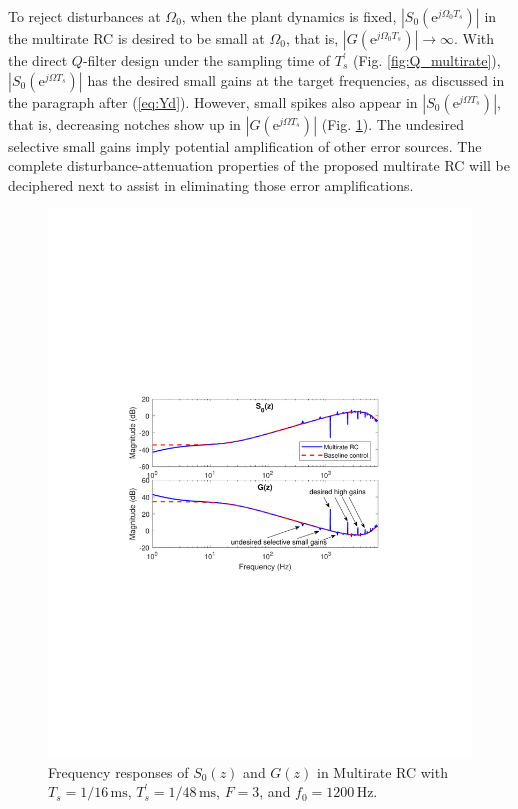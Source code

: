 \documentclass [11pt, proquest] {uwthesis}[2020/02/24]
\begin{document}
To reject disturbances at $\Omega_{0}$, when the plant dynamics
is fixed, $|S_{0}(\text{e}^{j\Omega_{0}T_{s}})|$ in the multirate
RC is desired to be small at $\Omega_{0}$, that is, $|G(\text{e}^{j\Omega_{0}T_{s}})|\rightarrow\infty$.
With the direct $Q$-filter design under the sampling time of $T_{s}^{'}$
(Fig. \ref{fig:Q_multirate}), $|S_{0}(\text{e}^{j\Omega T_{s}})|$
has the desired small gains at the target frequencies, as discussed
in the paragraph after (\ref{eq:Yd}). However, small spikes also
appear in $|S_{0}(\text{e}^{j\Omega T_{s}})|$, that is, decreasing
notches show up in $|G(\text{e}^{j\Omega T_{s}})|$ (Fig. \ref{fig:Sensitivity_func}).
The undesired selective small gains imply potential amplification
of other error sources. The complete disturbance-attenuation properties
of the proposed multirate RC will be deciphered next to assist in
eliminating those error amplifications.
\begin{figure}[!ht]
\begin{centering}
\includegraphics[width=12cm]{Fractional-order-RC/sensitivity_func_G_normalized}
\par\end{centering}
\caption{\label{fig:Sensitivity_func}Frequency responses of $S_{0}(z)$ and
$G(z)$ in Multirate RC with $T_{s}=1/16\,\text{ms}$, $T_{s}^{'}=1/48\,\text{ms}$,
$F=3$, and $f_{0}=1200\,\text{Hz}$. }
\end{figure}
\end{document}
